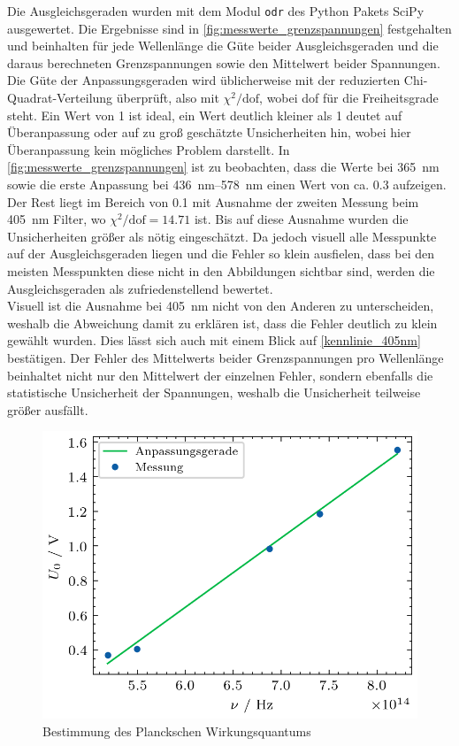 Die Ausgleichsgeraden wurden mit dem Modul \verb|odr| des Python Pakets SciPy\cite{scipy:odr}
ausgewertet. Die Ergebnisse sind in \cref{fig:messwerte_grenzspannungen} festgehalten
und beinhalten für jede Wellenlänge die Güte beider Ausgleichsgeraden und die daraus berechneten
Grenzspannungen sowie den Mittelwert beider Spannungen. \\

Die Güte der Anpassungsgeraden
wird üblicherweise mit der reduzierten Chi-Quadrat-Verteilung\cite{wiki:reduced_chi_square} überprüft, also mit
$\chi^2 / \mathrm{dof}$, wobei dof für die Freiheitsgrade steht. Ein Wert von 1 ist ideal,
ein Wert deutlich kleiner als 1 deutet auf Überanpassung oder auf zu groß geschätzte
Unsicherheiten hin, wobei hier Überanpassung kein mögliches Problem darstellt.
In \cref{fig:messwerte_grenzspannungen} ist zu beobachten, dass die Werte bei \SI{365}{\nano\meter}
sowie die erste Anpassung bei \qtyrange{436}{578}{\nano\meter} einen Wert von ca. \num{0.3}
aufzeigen. Der Rest liegt im Bereich von \num{0.1} mit Ausnahme der zweiten Messung beim
\SI{405}{\nano\meter} Filter, wo $\chi^2/\mathrm{dof} = \num{14.71}$ ist. Bis
auf diese Ausnahme wurden die Unsicherheiten größer als nötig eingeschätzt. Da jedoch
visuell alle Messpunkte auf der Ausgleichsgeraden liegen und die Fehler so klein ausfielen, dass
bei den meisten Messpunkten diese nicht in den Abbildungen sichtbar sind, werden die
Ausgleichsgeraden als zufriedenstellend bewertet. \\

Visuell ist die Ausnahme
bei \SI{405}{\nano\meter} nicht von den Anderen zu unterscheiden, weshalb die Abweichung
damit zu erklären ist, dass die Fehler deutlich zu klein gewählt wurden.
Dies lässt sich auch mit einem Blick auf \cref{kennlinie_405nm} bestätigen.
Der Fehler des Mittelwerts beider Grenzspannungen pro Wellenlänge beinhaltet
nicht nur den Mittelwert der einzelnen Fehler, sondern ebenfalls die statistische Unsicherheit
der Spannungen, weshalb die Unsicherheit teilweise größer ausfällt.\\

\begin{figure}[htb]
	\centering
	\includegraphics[width=0.75\linewidth]{../figs/photozelle_wirkungsquantum.png}
	\caption{Bestimmung des Planckschen Wirkungsquantums}
	\label{fig:bestimmung_planck}
\end{figure}

